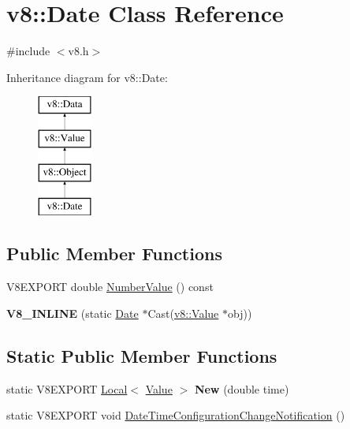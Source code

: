 \hypertarget{classv8_1_1_date}{}\section{v8\+:\+:Date Class Reference}
\label{classv8_1_1_date}


{\ttfamily \#include $<$v8.\+h$>$}

Inheritance diagram for v8\+:\+:Date\+:\begin{figure}[H]
\begin{center}
\leavevmode
\includegraphics[height=4.000000cm]{classv8_1_1_date}
\end{center}
\end{figure}
\subsection*{Public Member Functions}
\begin{DoxyCompactItemize}
\item 
V8\+E\+X\+P\+O\+R\+T double \hyperlink{classv8_1_1_date_ae9ccdc971d9738631ed2f28ef42d8a8c}{Number\+Value} () const 
\item 
\hypertarget{classv8_1_1_date_a5918bb5832fa739b2083b8c6d18d1174}{}{\bfseries V8\+\_\+\+I\+N\+L\+I\+N\+E} (static \hyperlink{classv8_1_1_date}{Date} $\ast$Cast(\hyperlink{classv8_1_1_value}{v8\+::\+Value} $\ast$obj))\label{classv8_1_1_date_a5918bb5832fa739b2083b8c6d18d1174}

\end{DoxyCompactItemize}
\subsection*{Static Public Member Functions}
\begin{DoxyCompactItemize}
\item 
\hypertarget{classv8_1_1_date_a00a33c616710d92dae77440182cc30b2}{}static V8\+E\+X\+P\+O\+R\+T \hyperlink{classv8_1_1_local}{Local}$<$ \hyperlink{classv8_1_1_value}{Value} $>$ {\bfseries New} (double time)\label{classv8_1_1_date_a00a33c616710d92dae77440182cc30b2}

\item 
static V8\+E\+X\+P\+O\+R\+T void \hyperlink{classv8_1_1_date_ab39a9ab67254d54956d4687f3dee6816}{Date\+Time\+Configuration\+Change\+Notification} ()
\end{DoxyCompactItemize}


